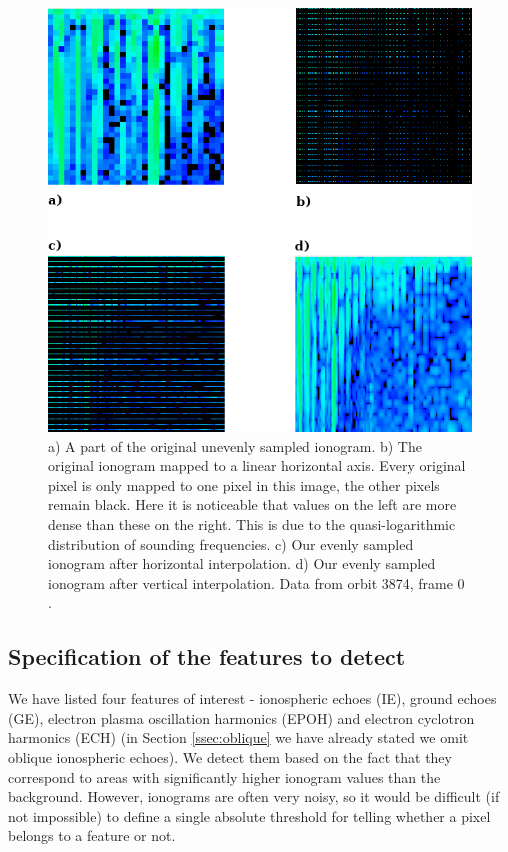 \begin{figure}[H]
	\centering
	\includegraphics[width=140mm]{images/even_and_uneven_ionogram.png}
	\caption{a) A part of the original unevenly sampled ionogram. b) The original ionogram mapped to a linear horizontal axis. Every original pixel is only mapped to one pixel in this image, the other pixels remain black. Here it is noticeable that values on the left are more dense than these on the right. This is due to the quasi-logarithmic distribution of sounding frequencies. c) Our evenly sampled ionogram after horizontal interpolation. d) Our evenly sampled ionogram after vertical interpolation. Data from orbit 3874, frame 0 \citep{FTP}.}
	\label{fig:even_uneven_iono}
\end{figure}

\subsection{Specification of the features to detect}
\label{ssec:results_spec}
We have listed four features of interest - ionospheric echoes (IE), ground echoes (GE), electron plasma oscillation harmonics (EPOH) and electron cyclotron harmonics (ECH) (in Section \ref{ssec:oblique} we have already stated we omit oblique ionospheric echoes). We detect them based on the fact that they correspond to areas with significantly higher ionogram values than the background. However, ionograms are often very noisy, so it would be difficult (if not impossible) to define a single absolute threshold for telling whether a pixel belongs to a feature or not. 

